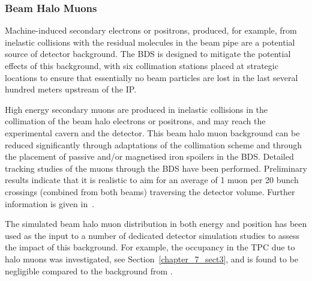 \subsubsection{Beam Halo Muons\label{sec:chapter3:environment:beamhalo}}

Machine-induced secondary electrons or positrons, produced, for example, from
inelastic collisions with the residual molecules in the beam pipe are a
potential source of detector background. The \acs{BDS} is designed to mitigate
the potential effects of this background, with six collimation stations placed
at strategic locations to ensure that essentially no beam particles are lost in
the last several hundred meters upstream of the \acs{IP}. 

High energy secondary muons are produced in inelastic collisions in the collimation of the beam halo 
electrons or positrons, and may reach the experimental cavern and the detector.
This beam halo muon background can be reduced significantly
through adaptations of the collimation scheme and through the placement of passive and/or
magnetised iron spoilers in the \acs{BDS}. Detailed tracking studies of the muons
through the \acs{BDS} have been performed. Preliminary results indicate that
it is realistic to aim for an average of 1 muon per 20 bunch crossings (combined from both beams) 
traversing the detector volume. Further information is given in~\cite{CLICacceleratorCDR}.

The simulated beam halo muon distribution in both energy and position has been used as the input to a number of 
dedicated detector simulation studies to assess the impact of this background.
For example, the occupancy in the \acs{TPC} due to halo muons 
was investigated, see Section~\ref{chapter_7_sect3}, and is
found to be negligible compared to the background from \gghadrons.

